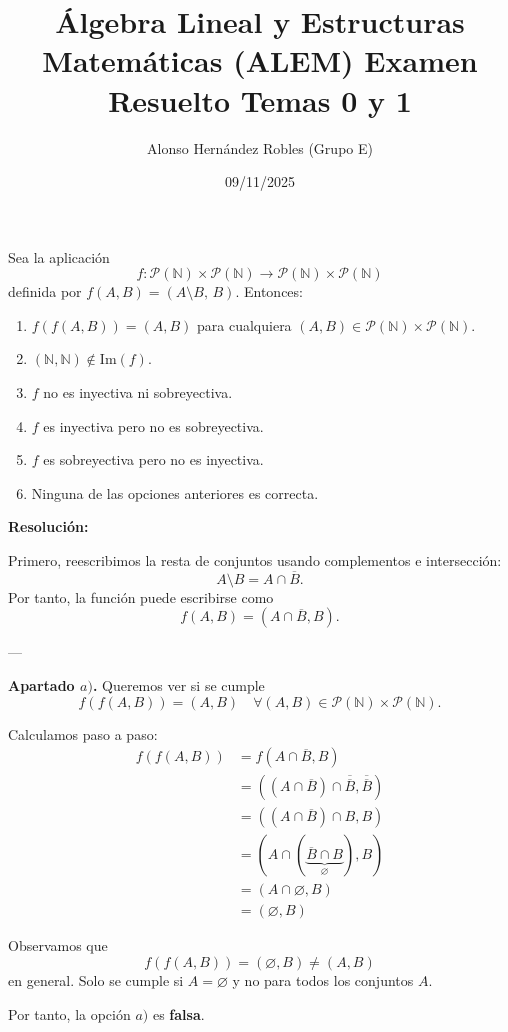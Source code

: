 \documentclass[a4paper,12pt]{article}
\title{Álgebra Lineal y Estructuras Matemáticas (ALEM) Examen Resuelto Temas 0 y 1}
\author{Alonso Hernández Robles (Grupo E)}
\date{09/11/2025}
\begin{document}
\maketitle

\begin{ejercicioExamen}[title=Ejercicio 1]
Sea la aplicación 
\[
f : \mathcal{P}(\mathbb{N}) \times \mathcal{P}(\mathbb{N}) \to 
\mathcal{P}(\mathbb{N}) \times \mathcal{P}(\mathbb{N})
\]
definida por \( f(A,B) = (A \setminus B,\, B) \). Entonces:

\begin{enumerate}
\item[$a)$] \( f(f(A,B)) = (A,B) \) para cualquiera \( (A,B) \in \mathcal{P}(\mathbb{N}) \times \mathcal{P}(\mathbb{N}) \).
\item[$b)$] \( (\mathbb{N}, \mathbb{N}) \notin \mathrm{Im}(f) \).
\item[$c)$] \( f \) no es inyectiva ni sobreyectiva.
\item[$d)$] \( f \) es inyectiva pero no es sobreyectiva.
\item[$e)$] \( f \) es sobreyectiva pero no es inyectiva.
\item[$f)$] Ninguna de las opciones anteriores es correcta.
\end{enumerate}

\tcblower
\textbf{Resolución:}

Primero, reescribimos la resta de conjuntos usando complementos e intersección:
\[
A \setminus B = A \cap \overline{B}.
\]
Por tanto, la función puede escribirse como
\[
f(A,B) = (A \cap \overline{B}, B).
\]

---

\medskip
\textbf{Apartado $a)$.} Queremos ver si se cumple
\[
f(f(A,B)) = (A,B) \quad \forall (A,B) \in \mathcal{P}(\mathbb{N}) \times \mathcal{P}(\mathbb{N}).
\]

Calculamos paso a paso:
\[
\begin{aligned}
f(f(A,B)) &= f(A \cap \overline{B}, B) \\
&=((A \cap \overline{B}) \cap \overline{\overline{B}}, \overline{\overline{B}}) \\
&= ((A \cap \overline{B}) \cap B, B) \\
&= (A \cap (\underbrace{\overline{B} \cap B}_{\varnothing}), B) \\
&= (A \cap \varnothing, B) \\
&= (\varnothing, B)
\end{aligned}
\]

Observamos que 
\[
f(f(A,B)) = (\varnothing, B) \neq (A,B)
\]
en general. Solo se cumple si \(A = \varnothing\) y no para todos los conjuntos \(A\).

\medskip
Por tanto, la opción $a)$ es \textbf{falsa}.

\end{ejercicioExamen}
\end{document}

